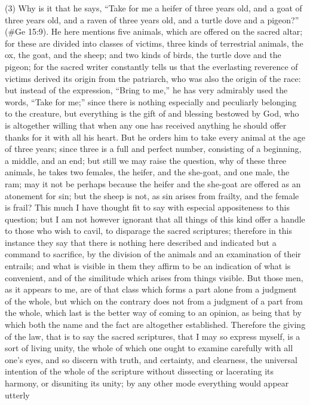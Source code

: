 (3) Why is it that he says, ``Take for me a heifer of three years old, and a goat of three years old,
and a raven of three years old, and a turtle dove and a pigeon?'' (\#Ge 15:9). He here mentions
five animals, which are offered on the sacred altar; for these are divided into classes of victims,
three kinds of terrestrial animals, the ox, the goat, and the sheep; and two kinds of birds, the turtle
dove and the pigeon; for the sacred writer constantly tells us that the everlasting reverence of
victims derived its origin from the patriarch, who was also the origin of the race: but instead of the
expression, ``Bring to me,'' he has very admirably used the words, ``Take for me;'' since there is
nothing especially and peculiarly belonging to the creature, but everything is the gift of and blessing
bestowed by God, who is altogether willing that when any one has received anything he should
offer thanks for it with all his heart. But he orders him to take every animal at the age of three
years; since three is a full and perfect number, consisting of a beginning, a middle, and an end; but
still we may raise the question, why of these three animals, he takes two females, the heifer, and
the she-goat, and one male, the ram; may it not be perhaps because the heifer and the she-goat
are offered as an atonement for sin; but the sheep is not, as sin arises from frailty, and the female
is frail? This much I have thought fit to say with especial appositeness to this question; but I am not
however ignorant that all things of this kind offer a handle to those who wish to cavil, to disparage
the sacred scriptures; therefore in this instance they say that there is nothing here described and
indicated but a command to sacrifice, by the division of the animals and an examination of their
entrails; and what is visible in them they affirm to be an indication of what is convenient, and of the
similitude which arises from things visible. But those men, as it appears to me, are of that class
which forms a part alone from a judgment of the whole, but which on the contrary does not from a
judgment of a part from the whole, which last is the better way of coming to an opinion, as being
that by which both the name and the fact are altogether established. Therefore the giving of the
law, that is to say the sacred scriptures, that I may so express myself, is a sort of living unity, the
whole of which one ought to examine carefully with all one's eyes, and so discern with truth, and
certainty, and clearness, the universal intention of the whole of the scripture without dissecting or
lacerating its harmony, or disuniting its unity; by any other mode everything would appear utterly
